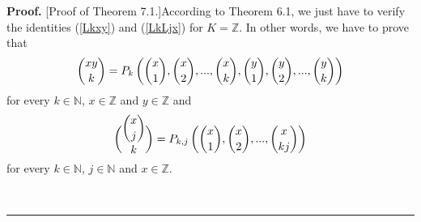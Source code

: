 \documentclass[numbers=enddot,12pt,final,onecolumn,notitlepage]{scrartcl}%
\newenvironment{proof}[1][Proof]{\noindent\textbf{#1.} }{\ \rule{0.5em}{0.5em}}
\begin{document}
\begin{proof}
[Proof of Theorem 7.1.]According to Theorem 6.1, we just have to verify the
identities (\ref{Lkxy}) and (\ref{LkLjx}) for $K=\mathbb{Z}$. In other words,
we have to prove that%
\begin{equation}
\dbinom{xy}{k}=P_{k}\left(  \dbinom{x}{1},\dbinom{x}{2},...,\dbinom{x}%
{k},\dbinom{y}{1},\dbinom{y}{2},...,\dbinom{y}{k}\right)  \label{7.1.Lkxy}%
\end{equation}
for every $k\in\mathbb{N}$, $x\in\mathbb{Z}$ and $y\in\mathbb{Z}$ and%
\begin{equation}
\dbinom{\dbinom{x}{j}}{k}=P_{k,j}\left(  \dbinom{x}{1},\dbinom{x}%
{2},...,\dbinom{x}{kj}\right)  \label{7.1.LkLjx}%
\end{equation}
for every $k\in\mathbb{N}$, $j\in\mathbb{N}$ and $x\in\mathbb{Z}.$


\end{proof}
\end{document}
